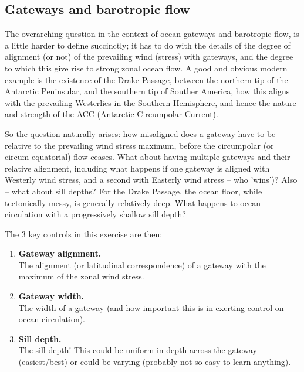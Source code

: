 
\subsection{Gateways and barotropic flow}

The overarching question in the context of ocean gateways and barotropic flow, is a little harder to define succinctly; it has to do with the details of the degree of alignment (or not) of the prevailing wind (stress)
with  gateways, and the degree to which this give rise to strong zonal ocean flow. A good and obvious modern example is the existence of the Drake Passage, between the northern tip of the Antarctic Peninsular, and the southern tip of Souther America, how this aligns with the prevailing Westerlies in the Southern Hemisphere, and hence the nature and strength of the ACC (Antarctic Circumpolar Current).

So the question naturally arises: how misaligned does a gateway have to be relative to the prevailing wind stress maximum, before the circumpolar (or circum-equatorial) flow ceases. What about having multiple gateways and their relative alignment, including what happens if one gateway is aligned with Westerly wind stress, and a second with Easterly wind stress -- who 'wins')? Also -- what about sill depths? For the Drake Passage, the ocean floor, while tectonically messy, is generally relatively deep. What happens to ocean circulation with a progressively shallow sill depth?

\newpage

The 3 key controls in this exercise are then:
\vspace{1mm}

\begin{enumerate}
\vspace{1mm}
\item \textbf{Gateway alignment.}
\vspace{1mm}
\\The  alignment (or latitudinal correspondence) of a gateway with the maximum of the zonal wind stress.
\vspace{1mm}
\item \textbf{Gateway width.}
\vspace{1mm}
\\The width of a gateway (and how important this is in exerting control on ocean circulation).
\vspace{1mm}
\item \textbf{Sill depth.}
\vspace{1mm}
\\The sill depth! This could be uniform in depth across the gateway (easiest/best) or could be varying (probably not so easy to learn anything).
\end{enumerate}
\vspace{2mm}

